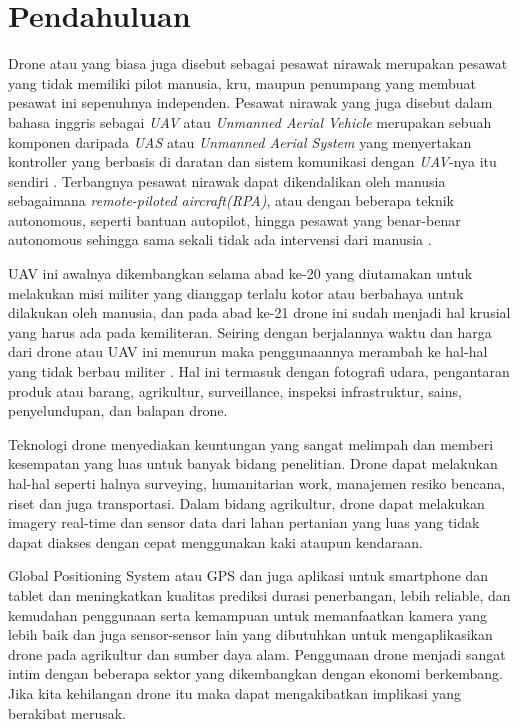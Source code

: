 \section{Pendahuluan}
\label{sec:pendahuluan}


Drone atau yang biasa juga disebut sebagai pesawat nirawak merupakan pesawat yang tidak memiliki pilot manusia, kru, maupun penumpang yang membuat pesawat ini sepenuhnya independen. Pesawat nirawak yang juga disebut dalam bahasa inggris sebagai \emph{UAV} atau \emph{Unmanned  Aerial Vehicle} merupakan sebuah komponen daripada \emph{UAS} atau \emph{Unmanned Aerial System} yang menyertakan kontroller yang berbasis di daratan dan sistem komunikasi dengan \emph{UAV}-nya itu sendiri \citep{HU2018162}. Terbangnya pesawat nirawak dapat dikendalikan oleh manusia sebagaimana \emph{remote-piloted aircraft(RPA)}, atau dengan beberapa teknik autonomous, seperti bantuan autopilot, hingga pesawat yang benar-benar autonomous sehingga sama sekali tidak ada intervensi dari manusia \citep{caryleslie2011}. 

UAV ini awalnya dikembangkan selama abad ke-20 yang diutamakan untuk melakukan misi militer yang dianggap terlalu kotor atau berbahaya untuk dilakukan oleh manusia, dan pada abad ke-21 drone ini sudah menjadi hal krusial yang harus ada pada kemiliteran. Seiring dengan berjalannya waktu dan harga dari drone atau UAV ini menurun maka penggunaannya merambah ke hal-hal yang tidak berbau militer \citep{tice2009}\citep{9423979}. Hal ini termasuk dengan fotografi udara, pengantaran produk atau barang, agrikultur, surveillance, inspeksi infrastruktur, sains\citep{drones4010005}\citep{w10050655}\citep{w10030264}\citep{w11030604}, penyelundupan\citep{dronesmuggle}, dan balapan drone. 

Teknologi drone menyediakan keuntungan yang sangat melimpah dan memberi kesempatan yang luas untuk banyak bidang penelitian. Drone dapat melakukan hal-hal seperti halnya surveying, humanitarian work, manajemen resiko bencana, riset dan juga transportasi\citep{AYAMGA2021120677}. Dalam bidang agrikultur, drone dapat melakukan imagery real-time dan sensor data dari lahan pertanian yang luas yang tidak dapat diakses dengan cepat menggunakan kaki ataupun kendaraan\citep{AYAMGA2021120677}.

Global Positioning System atau GPS dan juga aplikasi untuk smartphone dan tablet dan meningkatkan kualitas prediksi durasi penerbangan, lebih reliable, dan kemudahan penggunaan serta kemampuan untuk memanfaatkan kamera yang lebih baik dan juga sensor-sensor lain yang dibutuhkan untuk mengaplikasikan drone pada agrikultur dan sumber daya alam\citep{AYAMGA2021120677}. Penggunaan drone menjadi sangat intim dengan beberapa sektor yang dikembangkan dengan ekonomi berkembang. Jika kita kehilangan drone itu maka dapat mengakibatkan implikasi yang berakibat merusak.

